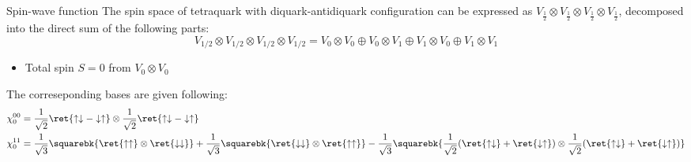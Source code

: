 \begin{frame}{Spin-wave function}
    The spin space of tetraquark with diquark-antidiquark configuration can be expressed as $V_{\frac{1}{2}}\otimes V_{\frac{1}{2}}\otimes V_{\frac{1}{2}}\otimes V_{\frac{1}{2}}$, decomposed into the direct sum of the following parts:
    \begin{equation}
        V_{1/2}\otimes V_{1/2}\otimes V_{1/2}\otimes V_{1/2} = V_{0}\otimes V_{0} \oplus V_{0}\otimes V_{1} \oplus V_{1}\otimes V_{0} \oplus V_{1}\otimes V_{1}
    \end{equation}


    \begin{itemize}
        \item Total spin $S=0$ from $V_{0}\otimes V_{0}$
    \end{itemize}
    The correseponding bases are given following:
    \begin{align}
        \chi^{00}_{0} & = \frac{1}{\sqrt{2}}\ret{\uparrow\downarrow-\downarrow\uparrow}\otimes\frac{1}{\sqrt{2}}\ret{\uparrow\downarrow-\downarrow\uparrow}                                                                                                                                                                                                                            \\
        \chi^{11}_{0} & = \frac{1}{\sqrt{3}}\squarebk{\ret{\uparrow\uparrow}\otimes\ret{\downarrow\downarrow}} + \frac{1}{\sqrt{3}}\squarebk{\ret{\downarrow\downarrow}\otimes\ret{\uparrow\uparrow}} - \frac{1}{\sqrt{3}}\squarebk{\frac{1}{\sqrt{2}}(\ret{\uparrow\downarrow}+\ret{\downarrow\uparrow})\otimes\frac{1}{\sqrt{2}}(\ret{\uparrow\downarrow}+\ret{\downarrow\uparrow})}
    \end{align}
\end{frame}
